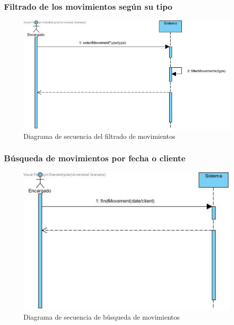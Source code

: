 \subsubsection{Filtrado de los movimientos según su tipo}

\begin{figure}[H]
	\centering
	\includegraphics[width=1\textwidth]{imagenes/imagenesDiagramas/Movimientos/filtrarMovimientos.jpg}
	\caption{Diagrama de secuencia del filtrado de movimientos}
	\label{fig:seqdiag25}
\end{figure}

\subsubsection{Búsqueda de movimientos por fecha o cliente}

\begin{figure}[H]
	\centering
	\includegraphics[width=1\textwidth]{imagenes/imagenesDiagramas/Movimientos/buscarMovimientos.jpg}
	\caption{Diagrama de secuencia de búsqueda de movimientos}
	\label{fig:seqdiag26}
\end{figure}

